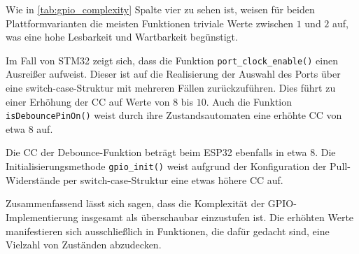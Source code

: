 Wie in \cref{tab:gpio_complexity} Spalte vier zu sehen ist, weisen für beiden Plattformvarianten die meisten Funktionen triviale Werte zwischen $1$ und $2$ auf, was eine hohe Lesbarkeit und Wartbarkeit begünstigt.

Im Fall von STM32 zeigt sich, dass die Funktion \texttt{port\_clock\_enable()} einen Ausreißer aufweist. 
Dieser ist auf die Realisierung der Auswahl des Ports über eine switch-case-Struktur mit mehreren Fällen zurückzuführen. 
Dies führt zu einer Erhöhung der CC auf Werte von $8$ bis $10$. 
Auch die Funktion \texttt{isDebouncePinOn()} weist durch ihre Zustandsautomaten eine erhöhte CC von etwa $8$ auf.

Die CC der Debounce-Funktion beträgt beim ESP32 ebenfalls in etwa $8$. 
Die Initialisierungsmethode \texttt{gpio\_init()} weist aufgrund der Konfiguration der Pull-Widerstände per switch-case-Struktur eine etwas höhere CC auf.

Zusammenfassend lässt sich sagen, dass die Komplexität der GPIO-Implementierung insgesamt als überschaubar einzustufen ist. 
Die erhöhten Werte manifestieren sich ausschließlich in Funktionen, die dafür gedacht sind, eine Vielzahl von Zuständen abzudecken.

